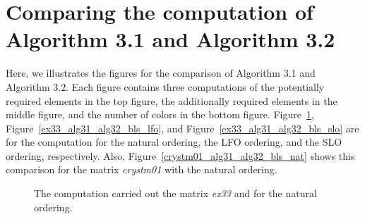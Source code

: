 \documentclass[12pt, twoside,a4paper,toc=bibliography]{scrbook}
\newcommand{\figref}[1]{Figure~\protect\ref{#1}}
\begin{document}
\section{Comparing the computation of Algorithm 3.1 and Algorithm 3.2}
\label{app.compare.alg31.alg32}
Here, we illustrates the figures for the comparison of Algorithm 3.1 and Algorithm 3.2.
Each figure contains three computations of the potentially required elements in the top figure,
the additionally required elements in the middle figure, and the number of colors in the bottom figure.
\figref{ex33_alg31_alg32_bls_nat}, \figref{ex33_alg31_alg32_bls_lfo},
and \figref{ex33_alg31_alg32_bls_slo} are for the computation for the natural ordering,
the LFO ordering, and the SLO ordering, respectively.
Also, \figref{crystm01_alg31_alg32_bls_nat} shows this comparison for the matrix \textit{crystm01}
with the natural ordering.
\begin{figure}
\caption{The computation carried out the matrix \textit{ex33} and for the natural ordering.}
\label{ex33_alg31_alg32_bls_nat}
\end{figure}
\end{document}
